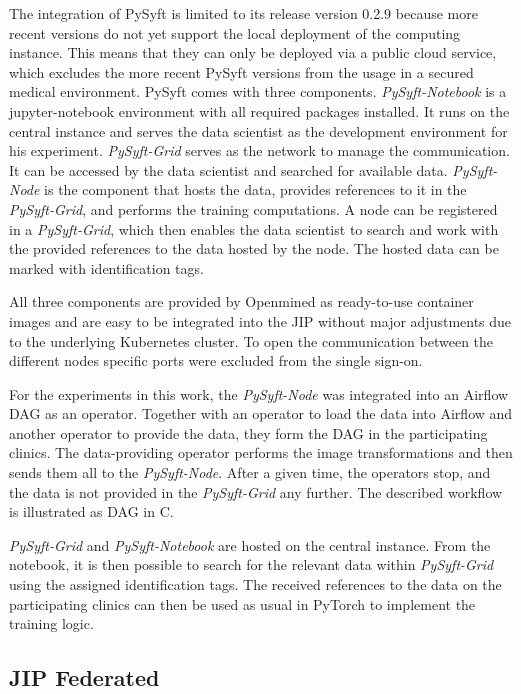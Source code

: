 The integration of PySyft is limited to its release version 0.2.9 because more recent versions do not yet support the local deployment of the computing instance.
This means that they can only be deployed via a public cloud service, which excludes the more recent PySyft versions from the usage in a secured medical environment.
PySyft comes with three components.
\textit{PySyft-Notebook} is a jupyter-notebook environment with all required packages installed. It runs on the central instance and serves the data scientist as the development environment for his experiment.
\textit{PySyft-Grid} serves as the network to manage the communication. It can be accessed by the data scientist and searched for available data.
\textit{PySyft-Node} is the component that hosts the data, provides references to it in the \textit{PySyft-Grid}, and performs the training computations. A node can be registered in a \textit{PySyft-Grid}, which then enables the data scientist to search and work with the provided references to the data hosted by the node. The hosted data can be marked with identification tags.

All three components are provided by Openmined as ready-to-use container images and are easy to be integrated into the JIP without major adjustments due to the underlying Kubernetes cluster. To open the communication between the different nodes specific ports were excluded from the single sign-on.

For the experiments in this work, the \textit{PySyft-Node} was integrated into an Airflow DAG as an operator. Together with an operator to load the data into Airflow and another operator to provide the data, they form the DAG in the participating clinics. The data-providing operator performs the image transformations and then sends them all to the \textit{PySyft-Node}. After a given time, the operators stop, and the data is not provided in the \textit{PySyft-Grid} any further. The described workflow is illustrated as DAG in  C.

\textit{PySyft-Grid} and \textit{PySyft-Notebook} are hosted on the central instance.
From the notebook, it is then possible to search for the relevant data within \textit{PySyft-Grid} using the assigned identification tags. The received references to the data on the participating clinics can then be used as usual in PyTorch to implement the training logic.


\subsection{JIP Federated}
\label{subsec:MethodsJIPFederated}

